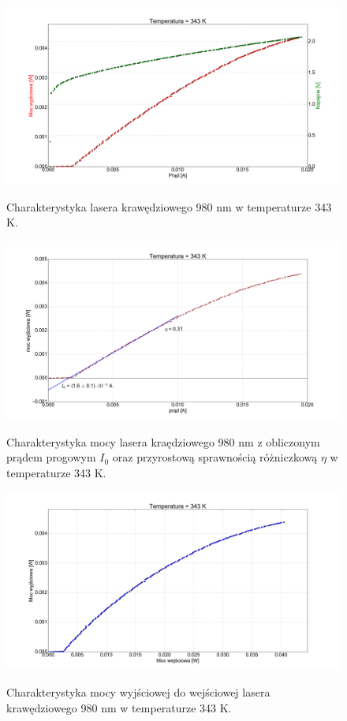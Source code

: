 \documentclass[a4paper, portrait,12pt]{report}
\begin{document}
\begin{figure}
\center
  \includegraphics[scale=0.30]{plot980/temp_70_IVL.png}
  \label{rys1}
  \caption{Charakterystyka lasera krawędziowego 980 nm w temperaturze 343 K.} 
\end{figure}

\begin{figure}
\center
  \includegraphics[scale=0.30]{plot980/temp_70_fit.png}
  \label{rys1}
  \caption{Charakterystyka mocy lasera kraędziowego 980 nm z obliczonym prądem progowym $I_0$ oraz przyrostową sprawnością różniczkową $\eta$ w temperaturze 343 K.} 
\end{figure}

\begin{figure}
\center
  \includegraphics[scale=0.30]{plot980/temp_70_power.png}
  \label{rys1}
  \caption{Charakterystyka mocy wyjściowej do wejściowej lasera krawędziowego 980 nm w temperaturze 343 K.} 
\end{figure}
\end{document}
